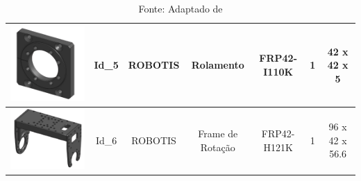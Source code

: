 \documentclass[
12pt,					%
openright,				%
twoside,				%
a4paper,				%
english,
brazil
]{ABNT/abntex2_report}
\begin{document}
\begin{table}[H]
\begin{adjustbox}{max width=\textwidth}
\begin{tabular}{|c|c|c|c|c|c|c|}
		\includegraphics[scale = 0.12]{appendix/rolamento42.png}           & Id\_5 & ROBOTIS        & Rolamento           & FRP42-I110K          & 1          & 42 x 42 x 5           \\ \hline
		\rowcolor[HTML]{EFEFEF} 
		\includegraphics[scale = 0.12]{appendix/frot3.png}       & Id\_6 & ROBOTIS        & Frame de Rotação    & FRP42-H121K          & 1          & 96 x 42 x 56.6        \\ \hline
		\end{tabular}
		\end{adjustbox}
		\caption*{Fonte: Adaptado de \cite{dynamixel}}
		\label{appen:lista_supor}
		\end{table}
\end{document}
